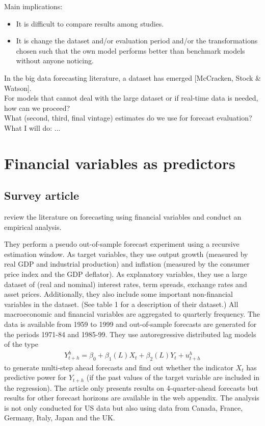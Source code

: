 \documentclass[12pt,a4paper]{scrartcl}
\begin{document}
Main implications:
\begin{itemize}
	\item It is difficult to compare results among studies.
	\item It is change the dataset and/or evaluation period and/or the transformations chosen such that the own model performs better than benchmark models without anyone noticing.
\end{itemize}

In the big data forecasting literature, a dataset has emerged [McCracken, Stock \& Watson].\\

For models that cannot deal with the large dataset or if real-time data is needed, how can we proceed?\\

What (second, third, final vintage) estimates do we use for forecast evaluation?\\

What I will do:
...

\section{Financial variables as predictors}

\subsection*{\citet{StockWatson2003} Survey article}

\citet{StockWatson2003} review the literature on forecasting using financial variables and conduct an empirical analysis. 

They perform a pseudo out-of-sample forecast experiment using a recursive estimation window. As target variables, they use output growth (measured by real GDP and industrial production) and inflation (measured by the consumer price index and the GDP deflator). As explanatory variables, they use a large dataset of (real and nominal) interest rates, term spreads, exchange rates and asset prices. Additionally, they also include some important non-financial variables in the dataset. (See table 1 for a description of their dataset.) All macroeconomic and financial variables are aggregated to quarterly frequency. The data is available from 1959 to 1999 and out-of-sample forecasts are generated for the periods 1971-84 and 1985-99. They use autoregressive distributed lag models of the type
\begin{align*}
Y^h_{t+h} = \beta_0 + \beta_1(L)X_t + \beta_2(L)Y_t + u^h_{t+h}
\end{align*}
to generate multi-step ahead forecasts and find out whether the indicator $X_t$ has predictive power for $Y_{t+h}$ (if the past values of the target variable are included in the regression). The article only presents results on 4-quarter-ahead forecasts but results for other forecast horizons are available in the web appendix. The analysis is not only conducted for US data but also using data from Canada, France, Germany, Italy, Japan and the UK.
\end{document}
